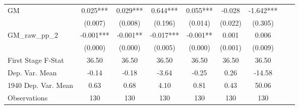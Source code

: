 \begin{tabular}{l*{8}{c}}
GM              &    0.025***&    0.029***&    0.644***&    0.055***&   -0.028   &   -1.642***\\
                &  (0.007)   &  (0.008)   &  (0.196)   &  (0.014)   &  (0.022)   &  (0.305)   \\
\addlinespace
GM\_raw\_pp\_2     &   -0.001***&   -0.001** &   -0.017***&   -0.001** &    0.001   &    0.006   \\
                &  (0.000)   &  (0.000)   &  (0.005)   &  (0.000)   &  (0.001)   &  (0.009)   \\
\midrule
First Stage F-Stat&    36.50   &    36.50   &    36.50   &    36.50   &    36.50   &    36.50   \\
Dep. Var. Mean  &    -0.14   &    -0.18   &    -3.64   &    -0.25   &     0.26   &   -14.58   \\
1940 Dep. Var. Mean&     0.63   &     0.68   &     4.10   &     0.81   &     0.43   &    50.06   \\
Observations    &      130   &      130   &      130   &      130   &      130   &      130   \\
       \bottomrule \end{tabular}
